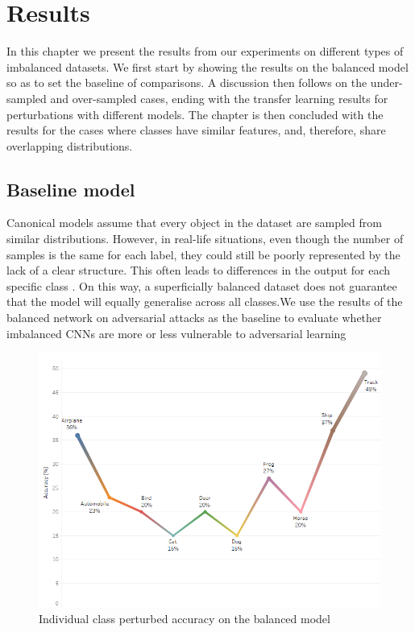 \chapter{Results} \label{chap:results}
In this chapter we present the results from our experiments on different types of imbalanced datasets. We first start by showing the results on the balanced model so as to set the baseline of comparisons. A discussion then follows on the under-sampled and over-sampled cases, ending with the transfer learning results for perturbations with different models. The chapter is then concluded with the results for the cases where classes have similar features, and, therefore, share overlapping distributions.

\section{Baseline model}
Canonical models assume that every object in the dataset are sampled from similar distributions. However, in real-life situations, even though the number of samples is the same for each label, they could still be poorly represented by the lack of a clear structure. This often leads to differences in the output for each specific class \cite{krawczyk2016learning}. On this way, a superficially balanced dataset does not guarantee that the model will equally generalise across all classes.We use the results of the balanced network on adversarial attacks as the baseline
to evaluate whether imbalanced CNNs are more or less vulnerable to adversarial
learning
\begin{figure}
	\centering
	\includegraphics[scale=0.7]{balanced_perturbed.png}
	\caption{Individual class perturbed accuracy on the balanced model}
	\label{fig:balanced_perturbed}
\end{figure}

